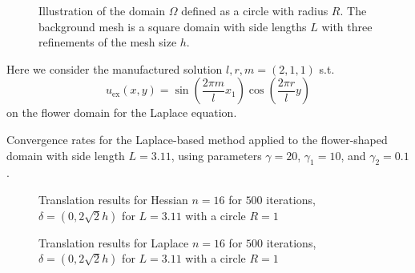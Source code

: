 \begin{figure}
{
}
    \caption{Illustration of the domain $\Omega $ defined as a circle with radius $R$. The background mesh is a square domain with side lengths $L$ with three refinements of the mesh size $h$.}
\end{figure}


Here we consider the manufactured solution $l,r,m = (2, 1, 1) $ s.t.
\[
u_{\text{ex}}(x,y) = \sin\left(\frac{2\pi m}{l}x_1\right)\cos\left(\frac{2\pi r}{l}y\right)
\]
on the flower domain for the Laplace equation.

\begin{table}

\caption{
Convergence rates for the Laplace-based method applied to the flower-shaped domain with side length $L=3.11$, using parameters $\gamma=20$, $\gamma_1=10$, and $\gamma_2=0.1$.
}
\end{table}



\begin{figure}[htp]
\centering

\subfloat[]{%

}

\subfloat[]{%

}


\caption{ Translation results for Hessian $n=16$ for $500$ iterations, $\delta =(0, 2 \sqrt{2}h) $ for $L=3.11$ with a circle $R=1$       }

\end{figure}

\begin{figure}[htp]
\centering

\subfloat[]{%

}

\subfloat[]{%

}


\caption{ Translation results for Laplace $n=16$ for $500$ iterations, $\delta =(0, 2 \sqrt{2}h) $ for $L=3.11$ with a circle $R=1$       }

\end{figure}
